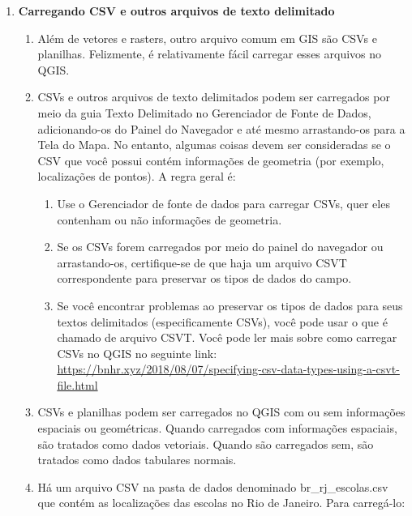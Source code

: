 \documentclass[
]{book}
\providecommand{\tightlist}{%
  \setlength{\itemsep}{0pt}\setlength{\parskip}{0pt}}
\begin{document}
\begin{enumerate}
\def\labelenumi{\arabic{enumi}.}
\setcounter{enumi}{3}
\item
  \textbf{Carregando CSV e outros arquivos de texto delimitado}

  \begin{enumerate}
  \def\labelenumii{\arabic{enumii}.}
  \item
    Além de vetores e rasters, outro arquivo comum em GIS são CSVs e planilhas. Felizmente, é relativamente fácil carregar esses arquivos no QGIS.
  \item
    CSVs e outros arquivos de texto delimitados podem ser carregados por meio da guia Texto Delimitado no Gerenciador de Fonte de Dados, adicionando-os do Painel do Navegador e até mesmo arrastando-os para a Tela do Mapa. No entanto, algumas coisas devem ser consideradas se o CSV que você possui contém informações de geometria (por exemplo, localizações de pontos). A regra geral é:

    \begin{enumerate}
    \def\labelenumiii{\arabic{enumiii}.}
    \tightlist
    \item
      Use o Gerenciador de fonte de dados para carregar CSVs, quer eles contenham ou não informações de geometria.
    \item
      Se os CSVs forem carregados por meio do painel do navegador ou arrastando-os, certifique-se de que haja um arquivo CSVT correspondente para preservar os tipos de dados do campo.
    \item
      Se você encontrar problemas ao preservar os tipos de dados para seus textos delimitados (especificamente CSVs), você pode usar o que é chamado de arquivo CSVT. Você pode ler mais sobre como carregar CSVs no QGIS no seguinte link: \href{https:\%20//bnhr.xyz/2018/08/07/specifying-csv-data-types-using-a-csvt-file.html}{https://bnhr.xyz/2018/08/07/specifying-csv-data-types-using-a-csvt-file.html}
    \end{enumerate}
  \item
    CSVs e planilhas podem ser carregados no QGIS com ou sem informações espaciais ou geométricas. Quando carregados com informações espaciais, são tratados como dados vetoriais. Quando são carregados sem, são tratados como dados tabulares normais.
  \item
    Há um arquivo CSV na pasta de dados denominado br\_rj\_escolas.csv que contém as localizações das escolas no Rio de Janeiro. Para carregá-lo:


\end{enumerate}
\end{enumerate}
\end{document}
